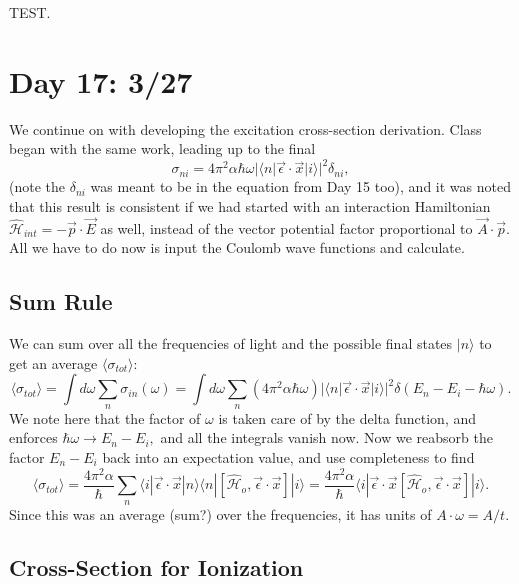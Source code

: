 \documentclass[fontsize=12pt]{scrartcl}
\newcommand{\la}{\langle}
\newcommand{\ra}{\rangle}
\newcommand{\Ham}{\hat{\mathcal{H}}}
\begin{document}
 TEST. 
 
 
\section{Day 17: 3/27}
We continue on with developing the excitation cross-section derivation. Class began with the same work, leading up to the final $$\sigma_{ni}=4\pi^2\alpha\hbar\omega |\la n|\vec{\epsilon}\cdot\vec{x}|i\ra|^2\delta_{ni},$$ (note the $\delta_{ni}$ was meant to be in the equation from Day 15 too), and it was noted that this result is consistent if we had started with an interaction Hamiltonian $\Ham_{int}=-\vec{p}\cdot\vec{E}$ as well, instead of the vector potential factor proportional to $\vec{A}\cdot\vec{p}$. All we have to do now is input the Coulomb wave functions and calculate.

\subsection{Sum Rule}

We can sum over all the frequencies of light and the possible final states $|n\ra$ to get an average $\la\sigma_{tot}\ra$: $$\la \sigma_{tot}\ra = \int d\omega \sum_n\sigma_{in}(\omega)=\int d\omega\sum_n (4\pi^2\alpha\hbar\omega)|\la n|\vec{\epsilon}\cdot\vec{x}|i\ra|^2\delta(E_n-E_i-\hbar\omega).$$ We note here that the factor of $\omega$ is taken care of by the delta function, and enforces $\hbar\omega\to E_n-E_i,$ and all the integrals vanish now. Now we reabsorb the factor $E_n-E_i$ back into an expectation value, and use completeness to find $$\la\sigma_{tot}\ra = \frac{4\pi^2\alpha}{\hbar}\sum_n \la i |\vec{\epsilon}\cdot\vec{x}|n\ra \la n|[\Ham_o,\vec{\epsilon}\cdot\vec{x}]|i\ra = \frac{4\pi^2\alpha}{\hbar}\la i |\vec{\epsilon}\cdot\vec{x}[\Ham_o, \vec{\epsilon}\cdot\vec{x}]|i\ra.$$ Since this was an average (sum?) over the frequencies, it has units of $A\cdot\omega=A/t$.



\subsection{Cross-Section for Ionization}
\end{document}
